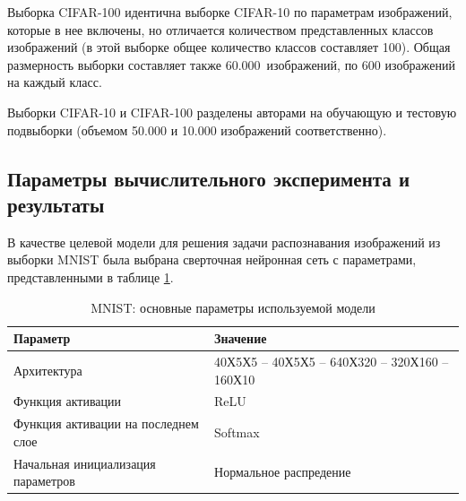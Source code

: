 Выборка CIFAR-100 идентична выборке CIFAR-10 по параметрам изображений, которые в нее включены, но отличается количеством представленных классов изображений (в этой выборке общее количество классов составляет 100). Общая размерность выборки составляет также 60.000~изображений, по 600 изображений на каждый класс.

Выборки CIFAR-10 и CIFAR-100 разделены авторами на обучающую и тестовую подвыборки (объемом 50.000 и 10.000 изображений соответственно).



\subsection{Параметры вычислительного эксперимента и результаты}

В качестве целевой модели для решения задачи распознавания изображений из выборки MNIST была выбрана сверточная нейронная сеть с параметрами, представленными в таблице \ref{table:mnist_conv_model}.

\begin{table} [!h]
  \caption{MNIST: основные параметры используемой модели}\label{table:mnist_conv_model}
\centering
\begin{tabular}{| p{7cm} | p{8cm} |}
  \hline
    \textbf{Параметр} & \textbf{Значение}\\
    \hline
    Архитектура & 40Х5Х5 -- 40Х5Х5 -- 640Х320 -- 320Х160 -- 160Х10\\
    \hline
    Функция активации & ReLU \\
    \hline
    Функция активации на последнем слое & Softmax \\
    Начальная инициализация параметров & Нормальное распредение \\
    \hline
\end{tabular}
\end{table}


